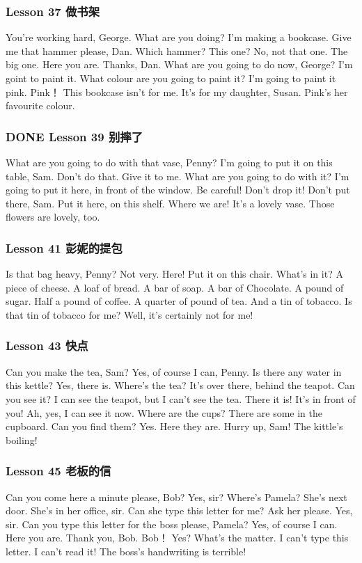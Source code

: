 \documentclass[11pt]{ctexart}
\begin{document}
\subsubsection{Lesson 37 做书架}
\label{sec:orgc3b9911}
You're working hard, George.
What are you doing?
I'm making a bookcase.
Give me that hammer please, Dan.
Which hammer?
This one?
No, not that one.
The big one.
Here you are.
Thanks, Dan.
What are you going to do now, George?
I'm goint to paint it.
What colour are you going to paint it?
I'm going to paint it pink.
Pink！
This bookcase isn't for me.
It's for my daughter, Susan.
Pink's her favourite colour.
\subsubsection{{\bfseries\sffamily DONE} Lesson 39 别摔了}
\label{sec:org79f89ad}
What are you going to do with that vase, Penny?
I'm going to put it on this table, Sam.
Don't do that.
Give it to me.
What are you going to do with it?
I'm going to put it here,
in front of the window.
Be careful!
Don't drop it!
Don't put there, Sam.
Put it here,
on this shelf.
Where we are!
It's a lovely vase.
Those flowers are lovely, too.
\subsubsection{Lesson 41 彭妮的提包}
\label{sec:orgea5c91f}
Is that bag heavy, Penny?
Not very.
Here!
Put it on this chair.
What's in it?
A piece of cheese.
A loaf of bread.
A bar of soap.
A bar of Chocolate.
A pound of sugar.
Half a pound of coffee.
A quarter of pound of tea.
And a tin of tobacco.
Is that tin of tobacco for me?
Well, it's certainly not for me!
\subsubsection{Lesson 43 快点}
\label{sec:orge431c00}
Can you make the tea, Sam?
Yes, of course I can, Penny.
Is there any water in this kettle?
Yes, there is.
Where's the tea?
It's over there, behind the teapot.
Can you see it?
I can see the teapot,
but I can't see the tea.
There it is!
It's in front of you!
Ah, yes, I can see it now.
Where are the cups?
There are some in the cupboard.
Can you find them?
Yes. Here they are.
Hurry up, Sam!
The kittle's boiling!
\subsubsection{Lesson 45 老板的信}
\label{sec:orgd572003}
Can you come here a minute please, Bob?
Yes, sir?
Where's Pamela?
She's next door.
She's in her office, sir.
Can she type this letter for me?
Ask her please.
Yes, sir.
Can you type this letter for the boss please, Pamela?
Yes, of course I can.
Here you are.
Thank you, Bob.
Bob！
Yes?
What's the matter.
I can't type this letter.
I can't read it!
The boss's handwriting is terrible!
\end{document}
